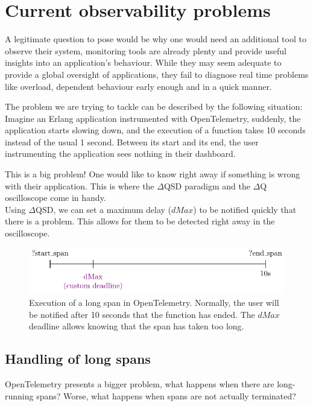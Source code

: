\section{Current observability problems}

    A legitimate question to pose would be why one would need an additional tool to observe their system, monitoring tools are already plenty and provide useful insights into an application's behaviour. While they may seem adequate to provide a global oversight of applications, they fail to diagnose real time problems like overload, dependent behaviour early enough and in a quick manner.

    The problem we are trying to tackle can be described by the following situation: 
    Imagine an Erlang application instrumented with OpenTelemetry, suddenly, the application starts slowing down, and the execution of a function takes 10 seconds instead of the usual 1 second. Between its start and its end, the user instrumenting the application sees nothing in their dashboard.
    
    This is a big problem! One would like to know right away if something is wrong with their application. This is where the $\Delta$QSD paradigm and the $\Delta$Q oscilloscope come in handy. \\ 
   Using $\Delta$QSD, we can set a maximum delay ($dMax$) to be notified quickly that there is a problem. This allows for them to be detected right away in the oscilloscope.
   
   \begin{figure}[H]
        \begin{center}
            \includegraphics{tikz/start_end_dmax.pdf}
        \end{center}
        \caption{Execution of a long span in OpenTelemetry. Normally, the user will be notified after 10 seconds that the function has ended. The $dMax$ deadline allows knowing that the span has taken too long.}
        \label{fig:otel_dmax}
    \end{figure} 


    \subsection{Handling of long spans}
        OpenTelemetry presents a bigger problem, what happens when there are long-running spans? Worse, what happens when spans are not actually terminated?
        
